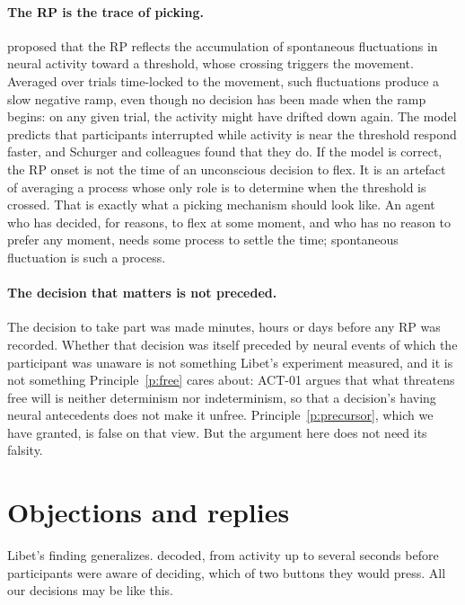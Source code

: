 \documentclass{situationist-preprint}
\begin{document}
\paragraph{The RP is the trace of picking.} \citet{Schurger2012} proposed that the RP reflects the accumulation of spontaneous fluctuations in neural activity toward a threshold, whose crossing triggers the movement. Averaged over trials time-locked to the movement, such fluctuations produce a slow negative ramp, even though no decision has been made when the ramp begins: on any given trial, the activity might have drifted down again. The model predicts that participants interrupted while activity is near the threshold respond faster, and Schurger and colleagues found that they do. If the model is correct, the RP onset is not the time of an unconscious decision to flex. It is an artefact of averaging a process whose only role is to determine when the threshold is crossed. That is exactly what a picking mechanism should look like. An agent who has decided, for reasons, to flex at some moment, and who has no reason to prefer any moment, needs some process to settle the time; spontaneous fluctuation is such a process.

\paragraph{The decision that matters is not preceded.} The decision to take part was made minutes, hours or days before any RP was recorded. Whether that decision was itself preceded by neural events of which the participant was unaware is not something Libet's experiment measured, and it is not something Principle~\ref{p:free} cares about: ACT-01 argues that what threatens free will is neither determinism nor indeterminism, so that a decision's having neural antecedents does not make it unfree. Principle~\ref{p:precursor}, which we have granted, is false on that view. But the argument here does not need its falsity.

\section{Objections and replies}

\begin{objection}[Generalization]
Libet's finding generalizes. \citet{Soon2008} decoded, from activity up to several seconds before participants were aware of deciding, which of two buttons they would press. All our decisions may be like this.
\end{objection}
\end{document}
